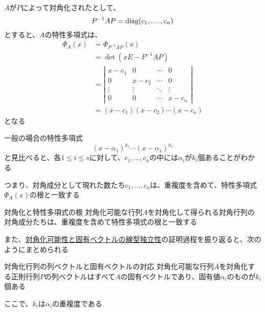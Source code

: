 \documentclass[../../../topic_linear-algebra]{subfiles}
\begin{document}
$A$が$P$によって対角化されたとして、
\begin{equation*}
  P^{-1}AP= \operatorname{diag}(c_1,\ldots, c_n)
\end{equation*}
とすると、$A$の特性多項式は、
\begin{align*}
  \Phi_A(x) & = \Phi_{P^{-1}AP}(x)                          \\
            & = \det(xE - P^{-1}AP)                         \\
            & = \left| \begin{matrix}
                         x - c_1 & 0       & \cdots & 0       \\
                         0       & x - c_2 & \cdots & 0       \\
                         \vdots  & \vdots  & \ddots & \vdots  \\
                         0       & 0       & \cdots & x - c_n
                       \end{matrix} \right| \\
            & = (x - c_1)(x - c_2) \cdots (x - c_n)
\end{align*}
となる

一般の場合の特性多項式
\begin{equation*}
  (x- \alpha_1)^{k_1}\cdots (x - \alpha_s)^{k_s}
\end{equation*}
と見比べると、各$1 \leq i \leq s$に対して、$c_1,\ldots,c_n$の中には$\alpha_i$が$k_i$個あることがわかる

\br

つまり、対角成分として現れた数たち$c_1,\ldots,c_n$は、重複度を含めて、特性多項式$\Phi_A(x)$の根と一致する

\begin{theorem}{対角化と特性多項式の根}
  対角化可能な行列$A$を対角化して得られる対角行列の対角成分たちは、重複度を含めて特性多項式の根と一致する
\end{theorem}

また、\hyperref[thm:diagonalizable-iff-n-indep-eigenvectors]{対角化可能性と固有ベクトルの線型独立性}の証明過程を振り返ると、次のようにまとめられる

\begin{theorem}{対角化行列の列ベクトルと固有ベクトルの対応}
  対角化可能な行列$A$を対角化する正則行列$P$の列ベクトルはすべて$A$の固有ベクトルであり、固有値$\alpha_i$のものが$k_i$個ある

  ここで、$k_i$は$\alpha_i$の重複度である
\end{theorem}
\end{document}
